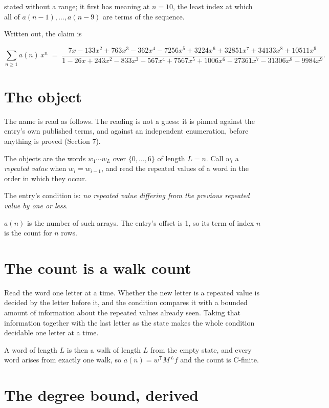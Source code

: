 \documentclass[11pt]{article}
\theoremstyle{definition}
\begin{document}
stated without a range; it first has meaning at $n = 10$, the least index at which all of $a(n-1),\dots,a(n-9)$ are terms of the sequence.

Written out, the claim is

\[\sum_{n \ge 1} a(n)\,x^n \;=\; \frac{7x - 133x^{2} + 763x^{3} - 362x^{4} - 7256x^{5} + 3224x^{6} + 32851x^{7} + 34133x^{8} + 10511x^{9}}{1 - 26x + 243x^{2} - 833x^{3} - 567x^{4} + 7567x^{5} + 1006x^{6} - 27361x^{7} - 31306x^{8} - 9984x^{9}}.\]

\section{The object}

The name is read as follows. The reading is not a guess: it is pinned against the entry's own published terms, and against an independent enumeration, before anything is proved (Section 7).

The objects are the words $w_1\cdots w_L$ over $\{0,\dots,6\}$ of length $L = n$. Call $w_i$ a {\itshape repeated value} when $w_i = w_{i-1}$, and read the repeated values of a word in the order in which they occur.

The entry's condition is: {\itshape no repeated value differing from the previous repeated value by one or less}.

$a(n)$ is the number of such arrays. The entry's offset is 1, so its term of index $n$ is the count for $n$ rows.

\section{The count is a walk count}

Read the word one letter at a time. Whether the new letter is a repeated value is decided by the letter before it, and the condition compares it with a bounded amount of information about the repeated values already seen. Taking that information together with the last letter as the state makes the whole condition decidable one letter at a time.

A word of length $L$ is then a walk of length $L$ from the empty state, and every word arises from exactly one walk, so $a(n) = w^{\mathsf T}M^{\,L}f$ and the count is C-finite.

\section{The degree bound, derived}
\end{document}
